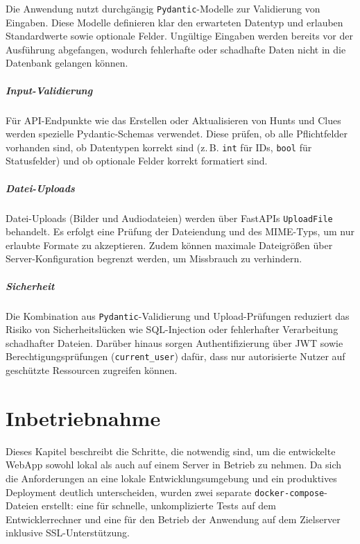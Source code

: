 \documentclass[oneside]{ausarbeitung}
\begin{document}
Die Anwendung nutzt durchgängig \texttt{Pydantic}-Modelle zur Validierung von Eingaben.  
Diese Modelle definieren klar den erwarteten Datentyp und erlauben Standardwerte sowie optionale Felder.  
Ungültige Eingaben werden bereits vor der Ausführung abgefangen, wodurch fehlerhafte oder schadhafte Daten nicht in die Datenbank gelangen können.

\paragraph{Input-Validierung}
Für API-Endpunkte wie das Erstellen oder Aktualisieren von Hunts und Clues werden spezielle Pydantic-Schemas verwendet.  
Diese prüfen, ob alle Pflichtfelder vorhanden sind, ob Datentypen korrekt sind (z.\,B. \texttt{int} für IDs, \texttt{bool} für Statusfelder) und ob optionale Felder korrekt formatiert sind.

\paragraph{Datei-Uploads}
Datei-Uploads (Bilder und Audiodateien) werden über FastAPIs \texttt{UploadFile} behandelt.  
Es erfolgt eine Prüfung der Dateiendung und des MIME-Typs, um nur erlaubte Formate zu akzeptieren.  
Zudem können maximale Dateigrößen über Server-Konfiguration begrenzt werden, um Missbrauch zu verhindern.

\paragraph{Sicherheit}
Die Kombination aus \texttt{Pydantic}-Validierung und Upload-Prüfungen reduziert das Risiko von Sicherheitslücken wie SQL-Injection oder fehlerhafter Verarbeitung schadhafter Dateien.  
Darüber hinaus sorgen Authentifizierung über JWT sowie Berechtigungsprüfungen (\texttt{current\_user}) dafür, dass nur autorisierte Nutzer auf geschützte Ressourcen zugreifen können.



\chapter{Inbetriebnahme}
\label{cha:inbetriebnahme}

Dieses Kapitel beschreibt die Schritte, die notwendig sind, um die entwickelte WebApp sowohl lokal als auch auf einem Server in Betrieb zu nehmen.  
Da sich die Anforderungen an eine lokale Entwicklungsumgebung und ein produktives Deployment deutlich unterscheiden, wurden zwei separate \texttt{docker-compose}-Dateien erstellt:  
eine für schnelle, unkomplizierte Tests auf dem Entwicklerrechner und eine für den Betrieb der Anwendung auf dem Zielserver inklusive SSL-Unterstützung.
\end{document}
